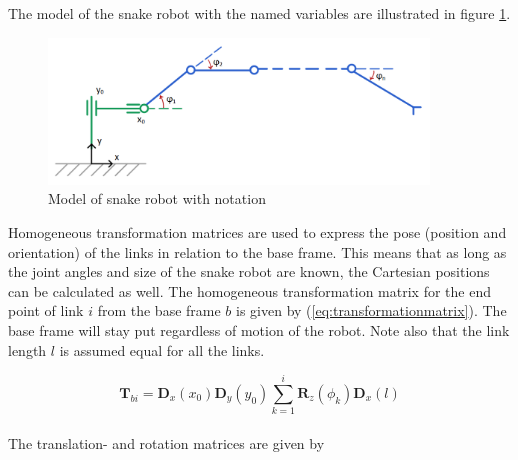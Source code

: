 The model of the snake robot with the named variables are illustrated in figure \ref{fig:kin_name}. 
\begin{figure}
    \centering
    \includegraphics[width=0.9\textwidth]{figures/kinematics.PNG}
    \caption{Model of snake robot with notation}
    \label{fig:kin_name}
\end{figure}


Homogeneous transformation matrices are used to express the pose (position and orientation) of the links in relation to the base frame. This means that as long as the joint angles and size of the snake robot are known, the Cartesian positions can be calculated as well.
The homogeneous transformation matrix for the end point of link $i$ from the base frame $b$ is given by (\ref{eq:transformationmatrix}). The base frame will stay put regardless of motion of the robot. Note also that the link length $l$ is assumed equal for all the links.

\begin{equation} \label{eq:transformationmatrix}
    \textbf{T}_{b i} = \textbf{D}_x(x_0) \textbf{D}_y(y_0) \sum_{k=1}^{i} \textbf{R}_z(\phi_k) \textbf{D}_x(l)
\end{equation}
\\
The translation- and rotation matrices are given by


